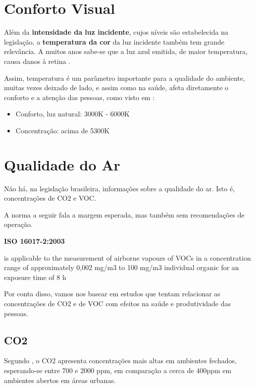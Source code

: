 \documentclass[]{politex}
\begin{document}
\section{Conforto Visual} %
Além da \textbf{intensidade da luz incidente}, cujos níveis são estabelecida na legislação, a \textbf{temperatura da cor} da luz incidente também tem grande relevância. A muitos anos sabe-se que a luz azul emitida, de maior temperatura, causa danos à retina \cite{BlueLight}. \par
Assim, temperatura é um parâmetro importante para a qualidade do ambiente, muitas vezes deixado de lado, e assim como na saúde, afeta diretamente o conforto e a atenção das pessoas, como visto em \cite{VisualComfort}: 
\begin{itemize}
\item Conforto, luz natural: 3000K - 6000K
\item Concentração: acima de 5300K 
\end{itemize}

\section{Qualidade do Ar} %

Não há, na legislação brasileira, informações sobre a qualidade do ar. Isto é, concentrações de CO2 e VOC. 

A norma a seguir fala a margem esperada, mas também sem recomendações de operação. 

\begin{citacaoLonga} %
\textbf{ISO 16017-2:2003}

is applicable to the measurement of airborne vapours of VOCs in a concentration range of approximately 0,002 mg/m3 to 100 mg/m3 individual organic for an exposure time of 8 h
\end{citacaoLonga}

Por conta disso, vamos nos basear em estudos que tentam relacionar as concentrações de CO2 e de VOC com efeitos na saúde e produtividade das pessoas. 

\subsection{CO2}
Segundo \cite{AirQuality}, o CO2 apresenta concentrações mais altas em ambientes fechados, esperando-se entre 700 e 2000 ppm, em comparação a cerca de 400ppm em ambientes abertos em áreas urbanas\cite{co2Earth}. 
\end{document}
